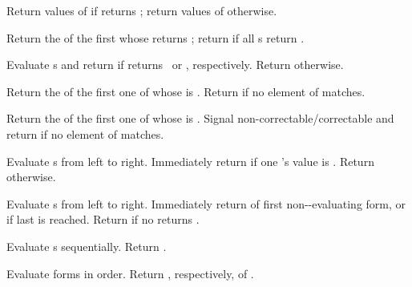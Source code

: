 \begin{LIST}{1cm}

  {
    Return values of  if  returns \T;
    return values of  otherwise. 
  }

  {
  Return the  of the first
   whose  returns \T; return
  \retval{\NIL} if all s return \NIL.
  }

  {
  Evaluate s and return  if 
  returns \T\ or \NIL, respectively. Return \retval{\NIL} otherwise. 
  }

  {
  Return the  of the first  one of whose  is
   .
  Return  if no element of  matches. 
  }

  {
  Return the  of the first  one of whose  is 
  . Signal non-correctable/correctable  and
  return \retval{\NIL} if no element of  matches. 
  }

  {
  Evaluate s from left to
  right. Immediately return \retval{\NIL} if one 's value is \NIL. Return
   otherwise.
  }

  {
  Evaluate s from left to
  right. Immediately return  of first
  non-\NIL-evaluating form, or  if last 
  is reached. Return \retval{\NIL} if no  returns \T.
  }

  {\label{:progn}
    Evaluate s sequentially. Return
    .
  }

  {
  Evaluate forms in order. Return ,
  respectively, of . 
  }


\end{LIST}
